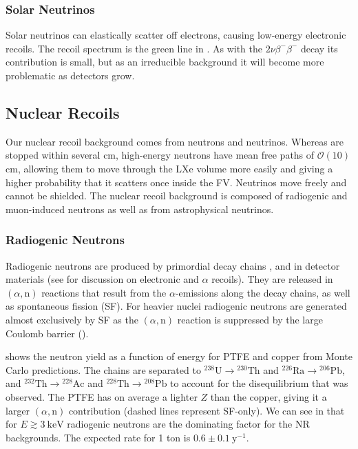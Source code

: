 \subsubsection{Solar Neutrinos}
\label{subsubsec:backgrounds_electronic_solar_neutrinos}
Solar neutrinos can elastically scatter off electrons, causing low-energy electronic recoils.  The recoil spectrum is the green line in
.  As with the  $2 \nu \beta^- \beta^-$
decay its contribution is small, but as an irreducible background it will become more problematic as detectors grow.



\subsection{Nuclear Recoils}
\label{subsec:backgrounds_nuclear}
Our nuclear recoil background comes from neutrons and neutrinos.  Whereas \gammarays are stopped within several cm, high-energy neutrons
have mean free paths of $\mathcal{O}(10)$ cm, allowing them to move through the LXe volume more easily and giving a higher probability
that it scatters once inside the FV.  Neutrinos move freely and cannot be shielded.  The nuclear recoil background is composed of
radiogenic and muon-induced neutrons as well as from astrophysical neutrinos.



\subsubsection{Radiogenic Neutrons}
\label{subsubsec:backgrounds_nuclear_radiogenic}
Radiogenic neutrons are produced by primordial decay chains ,  and  in detector materials
(see  for discussion on electronic and $\alpha$ recoils).  They are released in
$(\alpha, \mathrm{n})$ reactions that result from the $\alpha$-emissions along the decay chains, as well as spontaneous fission (SF).  For
heavier nuclei radiogenic neutrons are generated almost exclusively by SF as the $(\alpha, \mathrm{n})$ reaction is suppressed by the
large Coulomb barrier ().

 shows the neutron yield as a function of energy for PTFE and copper from Monte Carlo
predictions.  The chains are
separated to $\mathrm{^{238}U} \rightarrow \mathrm{^{230}Th}$ and $\mathrm{^{226}Ra} \rightarrow \mathrm{^{206}Pb}$, and
$\mathrm{^{232}Th} \rightarrow \mathrm{^{228}Ac}$ and $\mathrm{^{228}Th} \rightarrow \mathrm{^{208}Pb}$ to account for the disequilibrium
that was observed.  The PTFE has on average a lighter $Z$ than the copper, giving it a larger $(\alpha, \mathrm{n})$ contribution (dashed
lines represent SF-only).  We can see in  that for $E \gtrsim 3\ \mathrm{keV}$
radiogenic neutrons are the dominating factor for the NR backgrounds.  The expected rate for 1 ton is
$0.6 \pm 0.1\ \mathrm{y^{-1}}$.

